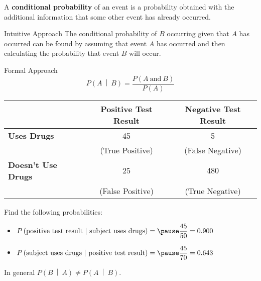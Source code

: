 \documentclass{beamer}
\newcommand{\prob}[1]{P\left(#1\right)}
\newcommand{\condprob}[2]{\prob{#1~\middle|~#2}}
\begin{document}
\begin{frame}
\begin{definition}
A \textbf{conditional probability} of an event is a probability obtained with the additional information that some other event has already occurred.
\end{definition}\pause

\begin{block}{Intuitive Approach}
The conditional probability of $B$ occurring given that $A$ has occurred can be found by assuming that event $A$ has occurred and then calculating the probability that event $B$ will occur. 
\end{block}\pause

\begin{block}{Formal Approach}
\begin{equation*}
\condprob{A}{B}=\dfrac{\prob{A~\text{and}~B}}{\prob{A}}
\end{equation*}
\end{block}
\end{frame}

\begin{frame}
\begin{example}
\begin{center}
\begin{tabular}{|l|c|c|}\hline
&\textbf{Positive Test Result} & \textbf{Negative Test Result} \\\hline
\textbf{Uses Drugs} & 45 & 5 \\
&(True Positive)&(False Negative)\\\hline
\textbf{Doesn't Use Drugs} & 25 & 480\\
&(False Positive) & (True Negative)\\\hline
\end{tabular}
\end{center}
Find the following probabilities:
\begin{itemize}
\item $\condprob{\text{positive test result}}{\text{subject uses drugs}}=\pause\dfrac{45}{50}=0.900$\pause
\item $\condprob{\text{subject uses drugs}}{\text{positive test result}}=\pause\dfrac{45}{70}=0.643$
\end{itemize}
\end{example}\pause

\begin{note}
In general $\condprob{B}{A}\neq\condprob{A}{B}$.
\end{note}
\end{frame}
\end{document}
